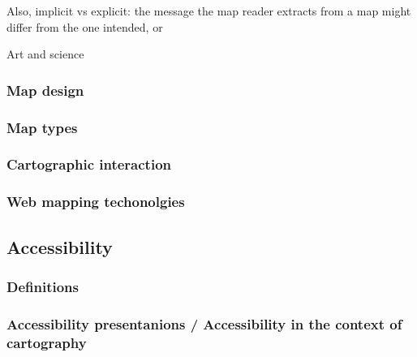 Also, implicit vs explicit:
the message the map reader extracts from a map might differ from the one intended, or


Art and science \parencite{mac2004, tyn1992}  %



\subsubsection{Map design}

\subsubsection{Map types}

\subsubsection{Cartographic interaction}

\textcite{rot2013a, rot2013b}

\subsubsection{Web mapping techonolgies}


\subsection{Accessibility}

\subsubsection{Definitions}

\subsubsection{Accessibility presentanions / Accessibility in the context of cartography}


